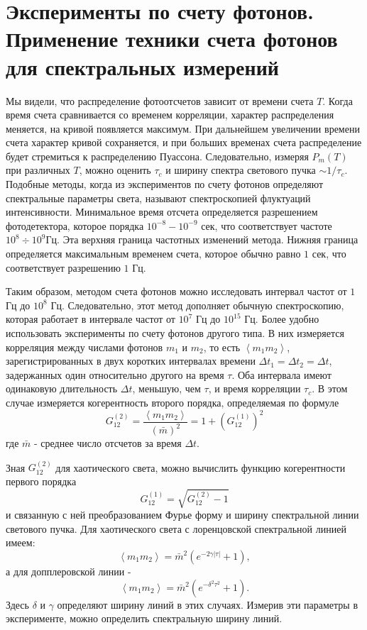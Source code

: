 \section{Эксперименты по счету фотонов. Применение техники счета
  фотонов для спектральных измерений}
Мы видели, что распределение фотоотсчетов зависит от времени счета
$T$. Когда время счета сравнивается со временем корреляции, характер
распределения меняется, на кривой появляется максимум. При дальнейшем
увеличении времени счета характер кривой сохраняется, и при больших
временах счета распределение будет стремиться к распределению
Пуассона. Следовательно, измеряя $P_m\left(T\right)$ при различных
$T$,  можно оценить $\tau_c$ и ширину спектра светового пучка $\sim
1/\tau_c$.  Подобные методы, когда из 
экспериментов по счету фотонов определяют спектральные параметры
света, называют спектроскопией флуктуаций интенсивности. Минимальное
время отсчета определяется разрешением фотодетектора, которое порядка
$10^{-8} - 10^{-9}$ сек,  что соответствует частоте $10^{8}\div
10^{9}$Гц.  Эта верхняя граница частотных изменений метода. Нижняя
граница определяется максимальным временем счета, которое обычно равно
$1$ сек, что соответствует разрешению  $1$ Гц. 

Таким образом, методом счета фотонов можно исследовать интервал частот
от $1$ Гц до $10^8$ Гц.  Следовательно, этот метод дополняет обычную 
спектроскопию, которая работает в интервале частот от $10^7$ Гц  до
$10^{15}$ Гц.  Более удобно использовать эксперименты по счету фотонов
другого типа. В них измеряется корреляция между числами фотонов $m_1$  и
$m_2$,  то есть $\left<m_1 m_2\right>$,  зарегистрированных в двух
коротких интервалах времени $\Delta t_1 = \Delta t_2 = \Delta t$,
задержанных один относительно другого на время $\tau$.  Оба интервала 
имеют одинаковую длительность $\Delta t$,  меньшую, чем $\tau$,  и
время корреляции $\tau_c$.  В этом случае измеряется когерентность второго порядка,
определяемая по формуле 
\[
G_{12}^{(2)} = \frac{\left<m_1 m_2\right>}{\left(\bar{m}\right)^2} = 
1 + \left(G_{12}^{(1)}\right)^2
\]
где $\bar{m}$ -  среднее число отсчетов за время $\Delta t$. 

Зная $G_{12}^{(2)}$ для хаотического света, можно вычислить функцию
когерентности первого порядка  
\[
G_{12}^{(1)} = \sqrt{G_{12}^{(2)} - 1}
\]
и связанную с ней преобразованием Фурье
форму и ширину спектральной линии светового пучка. Для хаотического света с
лоренцовской спектральной линией имеем: 
\begin{equation}
\left<m_1 m_2\right> = \bar{m}^2\left(e^{-2 \gamma \left|\tau\right|}
+ 1\right),
\label{eqCh4_68}
\end{equation}
а для допплеровской линии -
\begin{equation}
\left<m_1 m_2\right> = \bar{m}^2\left(e^{-\delta^2 \tau^2}
+ 1\right).
\label{eqCh4_69}
\end{equation}
Здесь $\delta$  и $\gamma$ определяют ширину линий в этих
случаях. Измерив эти параметры в эксперименте, можно определить
спектральную ширину линий. 
